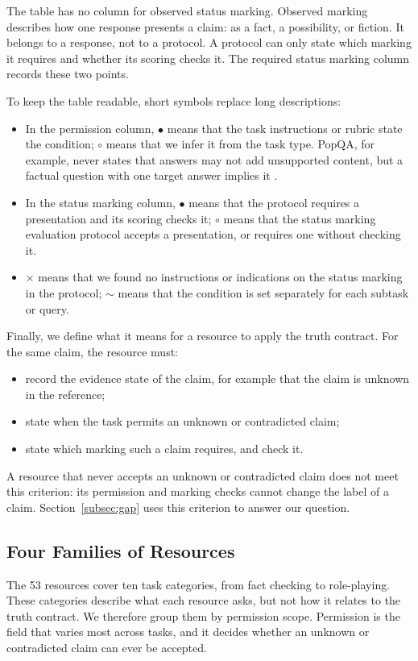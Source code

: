 \documentclass{clv2025}
\newcommand{\Stated}{\ensuremath{\bullet}}
\newcommand{\Weak}{\ensuremath{\circ}}
\newcommand{\Varies}{\ensuremath{\sim}}
\newcommand{\Lacks}{\ensuremath{\times}}
\begin{document}
The table has no column for observed status marking. Observed marking
describes how one response presents a claim: as a fact, a possibility, or
fiction. It belongs to a response, not to a protocol. A protocol can only
state which marking it requires and whether its scoring checks it.
The required status marking column records these two points.

To keep the table readable, short symbols replace long descriptions:
\begin{itemize}
\item In the permission column, \Stated{} means that the task instructions
or rubric state the condition; \Weak{} means that we infer it from the task
type. PopQA, for example, never states that answers may not add unsupported
content, but a factual question with one target answer implies it
\citep{mallen_when_2023}.
\item In the status marking column, \Stated{} means that the protocol requires a
presentation and its scoring checks it; \Weak{} means that the status marking evaluation protocol
accepts a presentation, or requires one without checking it.
\item \Lacks{} means that we found no instructions or indications on the status marking in the protocol; \Varies{}
means that the condition is set separately for each subtask or query.
\end{itemize}

Finally, we define what it means for a resource to apply the truth
contract. For the same claim, the resource must:
\begin{itemize}
\item record the evidence state of the claim, for example that the claim is
unknown in the reference;
\item state when the task permits an unknown or contradicted claim;
\item state which marking such a claim requires, and check it.
\end{itemize}
A resource that never accepts an unknown or contradicted claim does not
meet this criterion: its permission and marking checks cannot change the
label of a claim. Section~\ref{subsec:gap} uses this criterion to answer
our question.

\subsection{Four Families of Resources}\label{subsec:families}

The 53 resources cover ten task categories, from fact checking to
role-playing. These categories describe what each resource asks, but not
how it relates to the truth contract. We therefore group them by
permission scope. Permission is the field that varies most across tasks,
and it decides whether an unknown or contradicted claim can ever be
accepted.
\end{document}
